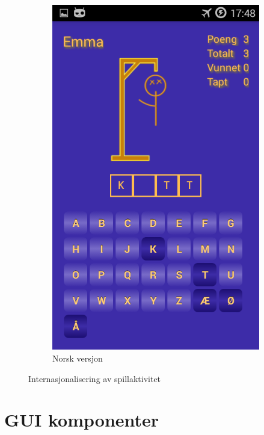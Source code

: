 \begin{figure}[ht]
\begin{subfigure}[b]{0.25\textwidth}
        \includegraphics[width=\textwidth]{./img/losninger/2.png}
        \caption{Norsk versjon}
        \label{fig:aktivitet_norsk}
    \end{subfigure}
    \caption{Internasjonalisering av spillaktivitet}
    \label{fig:aktiviteter_spill_internasjonalisering}
\end{figure}



\section{GUI komponenter}

